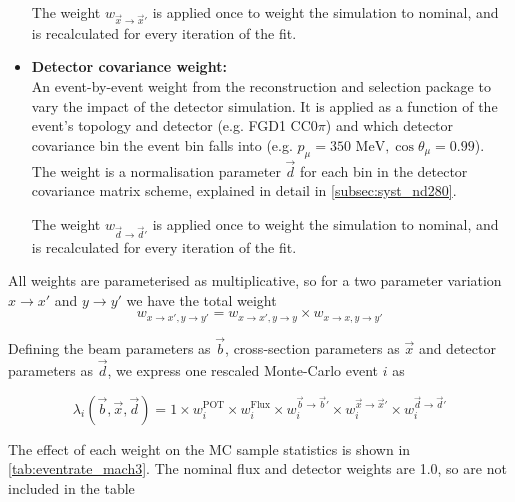 \begin{itemize}
	The weight $w_{\vec{x}\rightarrow \vec{x}'}$ is applied once to weight the simulation to nominal, and is recalculated for every iteration of the fit.
	
	\item \textbf{Detector covariance weight:} \\
	An event-by-event weight from the reconstruction and selection package to vary the impact of the detector simulation. It is applied as a function of the event's topology and detector (e.g. FGD1 CC0$\pi$) and which detector covariance bin the event bin falls into (e.g. $p_\mu=350\text{ MeV}, \cos\theta_\mu=0.99$). The weight is a normalisation parameter $\vec{d}$ for each bin in the detector covariance matrix scheme, explained in detail in \autoref{subsec:syst_nd280}.
	
	The weight $w_{\vec{d}\rightarrow \vec{d}'}$ is applied once to weight the simulation to nominal, and is recalculated for every iteration of the fit.
\end{itemize}

All weights are parameterised as multiplicative, so for a two parameter variation $x \rightarrow x'$ and $y \rightarrow y'$ we have the total weight 
\begin{equation}
w_{x \rightarrow x', y \rightarrow y'} = w_{x \rightarrow x', y \rightarrow y} \times w_{x \rightarrow x, y\rightarrow y'}
\end{equation}

Defining the beam parameters as $\vec{b}$, cross-section parameters as $\vec{x}$ and detector parameters as $\vec{d}$, we express one rescaled Monte-Carlo event $i$ as

\begin{equation}
\lambda_i\left(\vec{b}, \vec{x}, \vec{d}\right) = 1 \times w_i^\text{POT} \times w_i^\text{Flux} \times w^{\vec{b}\rightarrow \vec{b}'}_i \times w^{\vec{x} \rightarrow \vec{x}'}_i \times w^{\vec{d}\rightarrow \vec{d}'}_i
\label{eq:mc_scale}
\end{equation}

The effect of each weight on the MC sample statistics is shown in \autoref{tab:eventrate_mach3}. The nominal flux and detector weights are 1.0, so are not included in the table

